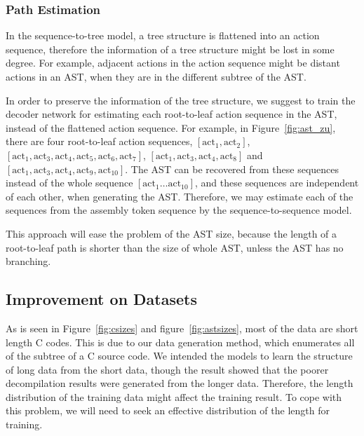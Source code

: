 \documentclass[11pt]{jarticle}
\begin{document}
\subsubsection{Path Estimation} 
In the sequence-to-tree model, a tree structure is flattened into an action sequence, 
therefore the information of a tree structure might be lost in some degree.
For example, adjacent actions in the action sequence might be distant actions in an AST, when they are in the different subtree of the AST.

In order to preserve the information of the tree structure, 
we suggest to train the decoder network for estimating each root-to-leaf action sequence in the AST,
instead of the flattened action sequence. 
For example, in Figure~\ref{fig:ast_zu}, there are four root-to-leaf action sequences, 
$ [\mathrm{act}_1, \mathrm{act}_2] $, $ [\mathrm{act}_1, \mathrm{act}_3,\mathrm{act}_4,\mathrm{act}_5,\mathrm{act}_6,\mathrm{act}_7] $, $ [\mathrm{act}_1, \mathrm{act}_3,\mathrm{act}_4,\mathrm{act}_8] $ and $ [\mathrm{act}_1, \mathrm{act}_3,\mathrm{act}_4,\mathrm{act}_9,\mathrm{act}_{10}] $.
The AST can be recovered from these sequences instead of the whole sequence $ [\mathrm{act}_1 \dots \mathrm{act}_{10}] $, 
and these sequences are independent of each other, when generating the AST.
Therefore, we may estimate each of the sequences from the assembly token sequence by the sequence-to-sequence model.

This approach will ease the problem of the AST size, because the length of a root-to-leaf path is shorter than the size of whole AST, unless the AST has no branching.







\subsection{Improvement on Datasets}
As is seen in Figure~\ref{fig:csizes} and figure~\ref{fig:astsizes}, most of the data are short length C codes.
This is due to our data generation method, which enumerates all of the subtree of a C source code.
We intended the models to learn the structure of long data from the short data, though the result showed that 
the poorer decompilation results were generated from the longer data.
Therefore, the length distribution of the training data might affect the training result.
To cope with this problem, we will need to seek an effective distribution of the length for training.





\end{document}
